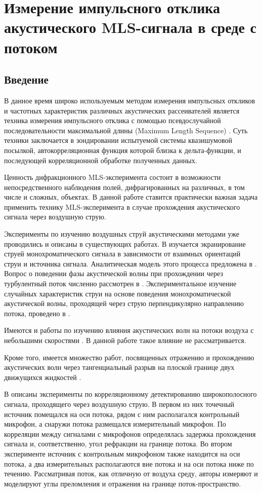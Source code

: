\chapter{Измерение импульсного отклика акустического MLS-сигнала в среде с потоком}

\section{Введение}
В данное время широко используемым методом измерения импульсных откликов и частотных характеристик различных акустических рассеивателей является техника измерения импульсного отклика с помощью псевдослучайной последовательности максимальной длины (Maximum Length Sequence) \cite{ValyaevMLS, ValyaevRoad, Denisov2017}. Суть техники заключается в зондировании испытуемой системы квазишумовой посылкой, автокорреляционная функция которой близка к дельта-функции, и последующей корреляционной обработке полученных данных.

Ценность дифракционного MLS-эксперимента состоит в возможности непосредственного наблюдения полей, дифрагированных на различных, в том числе и сложных, объектах. В данной работе ставится практически важная задача применить технику MLS-эксперимента в случае прохождения акустического сигнала через воздушную струю.

Эксперименты по изучению воздушных струй акустическими методами уже проводились и описаны в существующих работах. В \cite{Candel1976} изучается экранирование струей монохроматического сигнала в зависимости от взаимных ориентаций струи и источника сигнала. Аналитическая модель этого процесса предложена в \cite{Gerhold1983}. Вопрос о поведении фазы акустической волны при прохождении через турбулентный поток численно рассмотрен в \cite{Karweit1991}. Экспериментальное изучение случайных характеристик струи на основе поведения монохроматической акустической волны, проходящей через струю перпендикулярно направлению потока, проведено в \cite{HoChi}.
 
Имеются и работы по изучению влияния акустических волн на потоки воздуха с небольшими скоростями \cite{Golovanov2006, Vlasov1971}. В данной работе такое влияние не рассматривается.

Кроме того, имеется множество работ, посвященных отражению и прохождению акустических волн через тангенциальный разрыв на плоской границе двух движущихся жидкостей \cite{Friedland1969, Godin1988, Jones1973, Gottlieb1960}. 

В \cite{Ahuja1981} описаны эксперименты по корреляционному детектированию широкополосного сигнала, проходящего через воздушную струю. В первом из них точечный источник помещался на оси потока, рядом с ним располагался контрольный микрофон, а снаружи потока размещался измерительный микрофон. По корреляции между сигналами с микрофонов определялась задержка прохождения сигнала и, соответственно, угол рефракции на границе потока. Во втором эксперименте источник с контрольным микрофоном также находится на оси потока, а два измерительных располагаются вне потока и на оси потока ниже по течению. Рассматривая поток, как отличную от воздуха среду, авторы измеряют и моделируют углы преломления и отражения на границе поток-пространство. 

